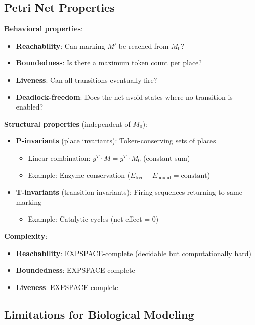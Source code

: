 \subsection{Petri Net Properties}
\label{subsec:pn-properties}

\textbf{Behavioral properties}:

\begin{itemize}
    \item \textbf{Reachability}: Can marking $M'$ be reached from $M_0$?
    \item \textbf{Boundedness}: Is there a maximum token count per place?
    \item \textbf{Liveness}: Can all transitions eventually fire?
    \item \textbf{Deadlock-freedom}: Does the net avoid states where no transition is enabled?
\end{itemize}

\textbf{Structural properties} (independent of $M_0$):

\begin{itemize}
    \item \textbf{P-invariants} (place invariants): Token-conserving sets of places
    \begin{itemize}
        \item Linear combination: $y^T \cdot M = y^T \cdot M_0$ (constant sum)
        \item Example: Enzyme conservation ($E_{\text{free}} + E_{\text{bound}} = \text{constant}$)
    \end{itemize}
    \item \textbf{T-invariants} (transition invariants): Firing sequences returning to same marking
    \begin{itemize}
        \item Example: Catalytic cycles (net effect = 0)
    \end{itemize}
\end{itemize}

\textbf{Complexity}:

\begin{itemize}
    \item \textbf{Reachability}: EXPSPACE-complete (decidable but computationally hard)
    \item \textbf{Boundedness}: EXPSPACE-complete
    \item \textbf{Liveness}: EXPSPACE-complete
\end{itemize}

\subsection{Limitations for Biological Modeling}
\label{subsec:pn-limitations}


